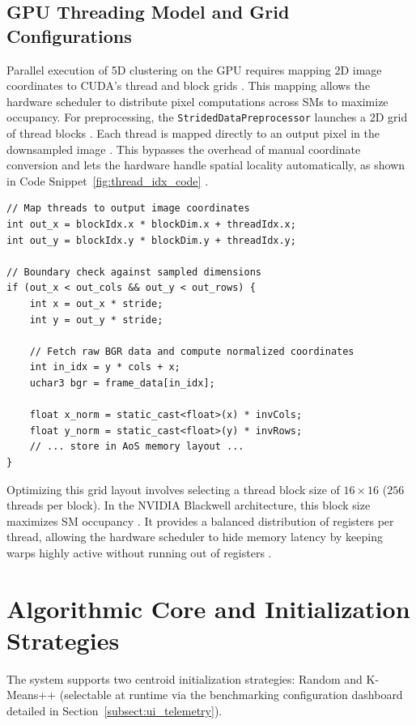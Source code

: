 \subsection{GPU Threading Model and Grid Configurations}
Parallel execution of 5D clustering on the GPU requires mapping 2D image coordinates to CUDA's thread and block grids \cite{CudaGuide}. This mapping allows the hardware scheduler to distribute pixel computations across SMs to maximize occupancy. For preprocessing, the \texttt{StridedDataPreprocessor} launches a 2D grid of thread blocks \cite{CudaGuide}. Each thread is mapped directly to an output pixel in the downsampled image \cite{cook2012cuda}. This bypasses the overhead of manual coordinate conversion and lets the hardware handle spatial locality automatically, as shown in Code Snippet~\ref{fig:thread_idx_code} \cite{CudaGuide}.

\begin{lstlisting}[float=htbp, caption={2D thread indexing and boundary check in \texttt{strided\_data\_\allowbreak preprocessor.cu} (lines 49-70).}, label={fig:thread_idx_code}]
// Map threads to output image coordinates
int out_x = blockIdx.x * blockDim.x + threadIdx.x;
int out_y = blockIdx.y * blockDim.y + threadIdx.y;

// Boundary check against sampled dimensions
if (out_x < out_cols && out_y < out_rows) {
    int x = out_x * stride;
    int y = out_y * stride;
    
    // Fetch raw BGR data and compute normalized coordinates
    int in_idx = y * cols + x;
    uchar3 bgr = frame_data[in_idx];
    
    float x_norm = static_cast<float>(x) * invCols;
    float y_norm = static_cast<float>(y) * invRows;
    // ... store in AoS memory layout ...
}
\end{lstlisting}

Optimizing this grid layout involves selecting a thread block size of $16 \times 16$ ($256$ threads per block). In the NVIDIA Blackwell architecture, this block size maximizes SM occupancy \cite{CudaGuide}. It provides a balanced distribution of registers per thread, allowing the hardware scheduler to hide memory latency by keeping warps highly active without running out of registers \cite{CudaGuide, cook2012cuda}.

\section{Algorithmic Core and Initialization Strategies}
The system supports two centroid initialization strategies: Random and K-Means++ (selectable at runtime via the benchmarking configuration dashboard detailed in Section~\ref{subsect:ui_telemetry}).

